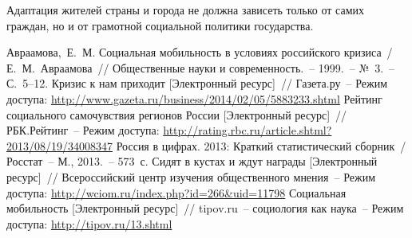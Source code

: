   Адаптация жителей страны и города не должна зависеть только от самих граждан,
  но и от грамотной социальной политики государства.

  \newpage

  \renewcommand{\bibname}{Список литературы}
  \begin{thebibliography}{9}
     Авраамова,~Е.~М. Социальная мобильность в условиях российского
      кризиса~/ Е.~М.~Авраамова~// Общественные науки и современность.~--
      1999.~-- №~3.~-- С.~5--12.
     Кризис к нам приходит [Электронный ресурс]~//
      Газета.ру~-- Режим доступа:
      \url{http://www.gazeta.ru/business/2014/02/05/5883233.shtml}
     Рейтинг социального самочувствия регионов России
      [Электронный ресурс]~// РБК.Рейтинг~-- Режим доступа:
      \url{http://rating.rbc.ru/article.shtml?2013/08/19/34008347}
     Россия в цифрах. 2013: Краткий статистический сборник~/
      Росстат~-- М., 2013.~-- 573~с.
     Сидят в кустах и ждут награды [Электронный ресурс]~//
      Всероссийский центр изучения общественного мнения~-- Режим доступа:
      \url{http://wciom.ru/index.php?id=266&uid=11798}
     Социальная мобильность [Электронный ресурс]~//
      tipov.ru~-- социология как наука~-- Режим доступа:
      \url{http://tipov.ru/13.shtml}
  \end{thebibliography}


